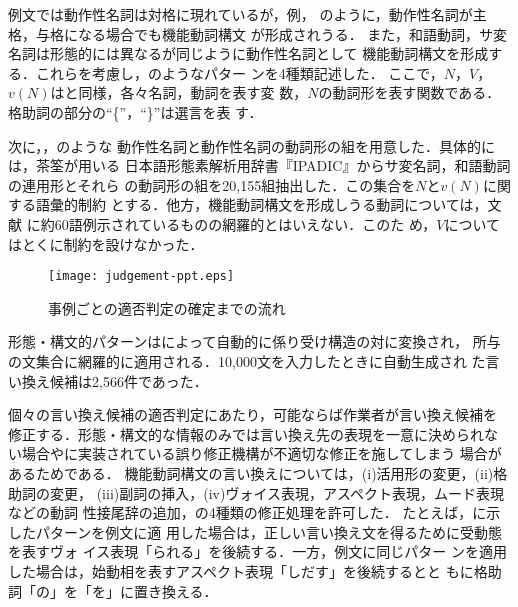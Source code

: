 例文では動作性名詞は対格に現れているが，例，
のように，動作性名詞が主格，与格になる場合でも機能動詞構文
が形成されうる．
また，和語動詞，サ変名詞は形態的には異なるが同じように動作性名詞として
機能動詞構文を形成する．これらを考慮し，のようなパター
ンを4種類記述した．
ここで，$N$，$V$，$v(N)$はと同様，各々名詞，動詞を表す変
数，$N$の動詞形を表す関数である．格助詞の部分の``\{''，``\}''は選言を表
す．

次に，，のような
動作性名詞と動作性名詞の動詞形の組を用意した．具体的には，茶筌が用いる
日本語形態素解析用辞書『IPADIC』からサ変名詞，和語動詞の連用形とそれら
の動詞形の組を20,155組抽出した．この集合を$N$と$v(N)$に関する語彙的制約
とする．他方，機能動詞構文を形成しうる動詞については，文献
\cite{muraki:91}に約60語例示されているものの網羅的とはいえない．このた
め，$V$についてはとくに制約を設けなかった．

\begin{figure}[t]
\leavevmode\vspace{-\baselineskip}
\begin{center}
\texttt{[image: judgement-ppt.eps]}
\caption{事例ごとの適否判定の確定までの流れ}
\label{fig:judgement}
\end{center}
\end{figure}


形態・構文的パターンは{\KURA}によって自動的に係り受け構造の対に変換され，
所与の文集合に網羅的に適用される．10,000文を入力したときに自動生成され
た言い換え候補は2,566件であった．


個々の言い換え候補の適否判定にあたり，可能ならば作業者が言い換え候補を
修正する．形態・構文的な情報のみでは言い換え先の表現を一意に決められな
い場合や{\KURA}に実装されている誤り修正機構が不適切な修正を施してしまう
場合があるためである．
機能動詞構文の言い換えについては，(i)活用形の変更，(ii)格助詞の変更，
(iii)副詞の挿入，(iv)ヴォイス表現，アスペクト表現，ムード表現などの動詞
性接尾辞の追加，の4種類の修正処理を許可した．
たとえば，に示したパターンを例文に適
用した場合は，正しい言い換え文を得るために受動態を表すヴォ
イス表現「られる」を後続する．一方，例文に同じパター
ンを適用した場合は，始動相を表すアスペクト表現「しだす」を後続するとと
もに格助詞「の」を「を」に置き換える．

